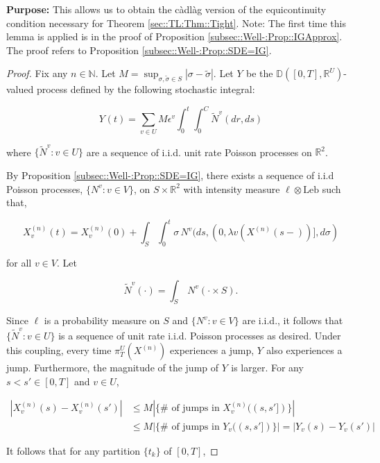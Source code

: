 \documentclass[12pt]{article}
\newcommand{\mb}{\mathbb}
\newcommand{\te}{\text}
\newcommand{\ep}{\epsilon}
\newcommand{\purpose}{\textbf{Purpose: }}
\newcommand{\ind}{\hspace{24pt}}
\newcommand{\cad}{\mb{D}}							%
\renewcommand{\v}{v}							%
\renewcommand{\U}{U}							%
\renewcommand{\S}{S}							%
\newcommand{\s}{\sigma}							%
\newcommand{\ev}{\ep}							%
\newcommand{\T}{T}								%
\renewcommand{\t}{t}							%
\newcommand{\proj}{\pi}							%
\renewcommand{\tt}{s}							%
\newcommand{\ttt}{s'}							%
\newcommand{\X}{X}								%
\newcommand{\vind}[1]{^{#1}}					%
\newcommand{\vsi}[1]{^{#1}}						%
\newcommand{\cind}[1]{_{#1}}					%
\newcommand{\tp}[1]{(#1)}						%
\newcommand{\tip}[1]{#1}						%
\newcommand{\ts}[1]{_{#1}}						%
\newcommand{\const}{C}							%
\newcommand{\sln}[1]{^{(#1)}}					%
\renewcommand{\ss}{\tilde{\s}}					%
\newcommand{\poiss}{N}							%
\newcommand{\leb}{\te{Leb}}						%
\newcommand{\Sm}{\ell}							%
\newcommand{\rate}{\lambda}						%
\renewcommand{\r}{r}							%
\newcommand{\cconst}{M}							%
\newcommand{\alt}[1]{\widetilde{#1}}			%
\newcommand{\indx}[1]{_{#1}}					%
\newcommand{\XX}{Y}								%
\renewcommand{\it}{k}							%
\begin{document}
\purpose This allows us to obtain the c\`adl\`ag version of the equicontinuity condition necessary for Theorem \ref{sec::TL:Thm::Tight}. Note: The first time this lemma is applied is in the proof of Proposition \ref{subsec::Well-:Prop::IGApprox}. The proof refers to Proposition \ref{subsec::Well-:Prop::SDE=IG}.

\begin{proof}
Fix any \(n \in \mb{N}\). Let \(\cconst = \sup_{\s,\ss \in \S} |\s - \ss|\). Let \(\XX\cind{}\tip{}\) be the \(\cad([0,\T],\mb{R}^\U)\)-valued process defined by the following stochastic integral:

\[\XX\cind{}\tp{\t} = \sum_{\v \in \U}\cconst\ev\vind{\v}\int_0^\t\int_0^{\const\indx{}}\alt{\poiss}\vind{\v}(d\r, d\tt)\]

where \(\{\alt{\poiss}\vind{\v}:\v \in \U\}\) are a sequence of i.i.d. unit rate Poisson processes on \(\mb{R}^2\). 

\ind By Proposition \ref{subsec::Well-:Prop::SDE=IG}, there exists a sequence of i.i.d Poisson processes, \(\{\poiss\vind{\v}:\v\in V\}\), on \(\S\times\mb{R}^2\) with intensity measure \(\Sm\otimes \leb\) such that,

\[\X\sln{n}\cind{\v}\tp{\t} = \X\sln{n}\cind{\v}\tp{0} + \int_\S\int_0^\t \s\,\poiss\vind{\v}(d\tt,(0,\rate{\v}(\X\sln{n}\cind{}\tp{\tt-})],d\s)\]

for all \(\v\in V\). Let

\[\alt{\poiss}\vind{\v}(\cdot) = \int_\S\,\poiss\vind{\v}(\cdot\times \S).\]

Since \(\Sm\) is a probability measure on \(\S\) and \(\{\poiss\vind{\v}:\v\in V\}\) are i.i.d., it follows that \(\{\alt{\poiss}\vind{\v}:\v\in \U\}\) is a sequence of unit rate i.i.d. Poisson processes as desired. Under this coupling, every time \(\proj\vsi{\U}\ts{\T}(\X\sln{n}\cind{}\tip{})\) experiences a jump, \(\XX\cind{}\tip{}\) also experiences a jump. Furthermore, the magnitude of the jump of \(\XX\cind{}\tip{}\) is larger. For any \(\tt<\ttt\in [0,\T]\) and \(\v\in \U\),

\begin{align*}
|\X\sln{n}\cind{\v}\tp{\tt} - \X\sln{n}\cind{\v}\tp{\ttt}|&\leq \cconst\left|\{\#\te{ of jumps in }\X\sln{n}\cind{\v}\tp{(\tt,\ttt]}\}\right| \\
&\leq \cconst\left|\{\#\te{ of jumps in }\XX\cind{\v}\tp{(\tt,\ttt]}\}\right| = \left|\XX\cind{\v}\tp{\tt} - \XX\cind{\v}\tp{\ttt}\right|
\end{align*}

It follows that for any partition \(\{\t\indx{\it}\}\) of \([0,\T]\),


\end{proof}
\end{document}
